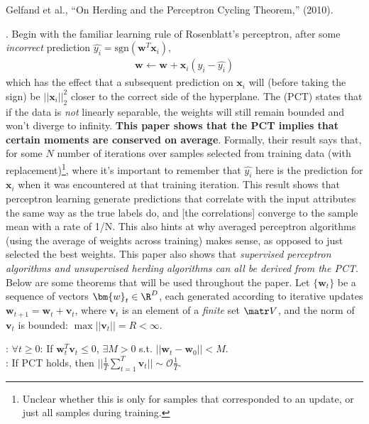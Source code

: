 \documentclass[11pt]{article}
\renewcommand\vec[2][]{\bm{#2}_{#1}}
\newcommand\p{\Needspace{10\baselineskip} \noindent}
\begin{document}
\vspace{-1em}
{\footnotesize Gelfand et al., ``On Herding and the Perceptron Cycling Theorem,'' (2010).}


\p {}. Begin with the familiar learning rule of Rosenblatt's perceptron, after some \textit{incorrect} prediction $\hat{y_i} = \text{sgn}(\vec{w}^T \vec[i]{x})$,
\begin{align}
	\vec{w} \leftarrow \vec{w} + \vec[i]{x}(y_i - \hat{y_i})
\end{align}
which has the effect that a subsequent prediction on $\vec[i]{x}$ will (before taking the sign) be $||\vec[i]{x}||_2^2$ closer to the correct side of the hyperplane. The  (PCT) states that if the data is \textit{not} linearly separable, the weights will still remain bounded and won't diverge to infinity. \textbf{This paper shows that the PCT implies that certain moments are conserved on average}. Formally, their result says that, for some $N$ number of iterations over samples selected from training data (with replacement)\footnote{Unclear whether this is only for samples that corresponded to an update, or just all samples during training.},
\graybox{
	\bigg|\bigg| 
		\inv{N} \sum_{i}^{N} \vec[i]{x} y_i - \inv{N} \sum_i^N \vec[i]{x}\hat{y_i}
	\bigg|\bigg|	
	\sim 
	\mathcal{O}\left(\inv{N}\right)
}
where it's important to remember that $\hat{y_i}$ here is the prediction for $\vec[i]{x}$ when it was encountered at that training iteration. This result shows that perceptron learning generate predictions that correlate with the input attributes the same way as the true labels do, and [the correlations] converge to the sample mean with a rate of 1/N. This also hints at why averaged perceptron algorithms (using the average of weights across training) makes sense, as opposed to just selected the best weights. This paper also shows that \textit{supervised perceptron algorithms and unsupervised herding algorithms can all be derived from the PCT}. \\

Below are some theorems that will be used throughout the paper. Let $\{\vec[t]{w}\}$ be a sequence of vectors $\vec[t]{w} \in \R^{D}$, each generated according to iterative updates $\vec[t+1]{w} = \vec[t]{w} + \vec[t]{v}$, where $\vec[t]{v}$ is an element of a \textit{finite} set $\matr V$, and the norm of $\vec[t]{v}$ is bounded: $\max ||\vec[t]{v}|| = R < \infty$. 
\begin{definition}
	: $\forall t \ge 0$: If $\vec[t]{w}^T \vec[t]{v} \le 0$, $\exists M > 0$ s.t. $||\vec[t]{w} - \vec[0]{w}|| < M$. \\
	: If PCT holds, then $||\tfrac{1}{T} \sum_{t=1}^T \vec[t]{v} || \sim \mathcal{O}{\tfrac{1}{T}}$. 
\end{definition}
\end{document}
